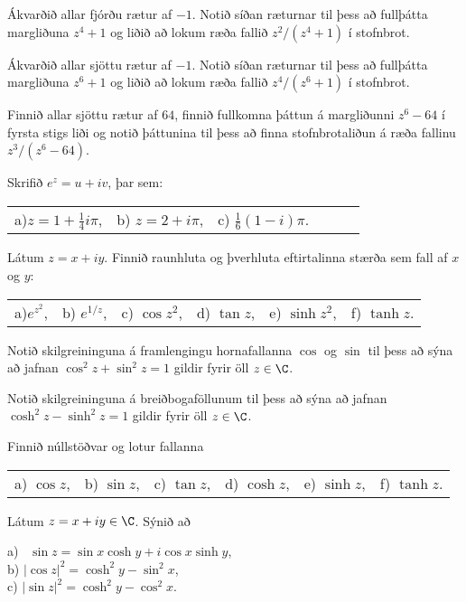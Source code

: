 \daemi Ákvarðið allar fjórðu rætur af $-1$.  Notið síðan ræturnar til
þess að fullþátta  margliðuna $z^4+1$  og liðið að lokum
 ræða fallið $z^2/(z^4+1)$ í stofnbrot.


\daemi Ákvarðið allar sjöttu  rætur af $-1$.  Notið síðan ræturnar til
þess að fullþátta  margliðuna $z^6+1$ og  liðið að lokum  ræða fallið
$z^4/(z^6+1)$ í stofnbrot.

\daemi Finnið allar sjöttu rætur af $64$, finnið fullkomna þáttun á
margliðunni $z^6-64$ í fyrsta stigs liði og notið þáttunina til þess
að finna stofnbrotaliðun á ræða fallinu $z^3/(z^6-64)$.


\daemi Skrifið $e^z=u+iv$, þar sem:


\smallskip\noindent
\begin{tabular}{llllll}
 a)$z=1+\tfrac 14i\pi$, 
&b) $z=2+i\pi$,
&c) $\tfrac16(1-i)\pi$.
\end{tabular}

\daemi Látum $z=x+iy$. Finnið raunhluta og þverhluta eftirtalinna
stærða sem fall af $x$ og $y$:

\smallskip\noindent
\begin{tabular}{llllll}
 a)$e^{z^2}$, 
&b) $e^{1/z}$,
&c) $\cos z^2$,
&d) $\tan z$, 
&e) $\sinh z^2$,
&f) $\tanh z$.\\
\end{tabular}


\daemi Notið skilgreininguna á framlengingu hornafallanna $\cos $ og $\sin $ til
þess að sýna að jafnan $\cos^2z+\sin^2z=1$ gildir fyrir öll $z\in \C$. 

\daemi Notið skilgreininguna á breiðbogaföllunum til þess að sýna
að  jafnan $\cosh^2 z-\sinh^2 z=1$ gildir fyrir öll $z\in \C$.


\daemi Finnið núllstöðvar og lotur fallanna

\smallskip\noindent
\begin{tabular}{llllll}
 a) $\cos z$, 
&b) $\sin z$,
&c) $\tan z$,
&d) $\cosh z$, 
&e) $\sinh z$,
&f) $\tanh z$.\\
\end{tabular}

\daemi Látum $z=x+iy\in \C$.  Sýnið  að

\smallskip\noindent
a)  \ $\sin z=\sin x\cosh y+i\cos x \sinh y$,\\
b) $|\cos z|^2=\cosh^2y-\sin^2 x$,\\
c)  $|\sin z|^2=\cosh^2y-\cos^2 x$.\\



